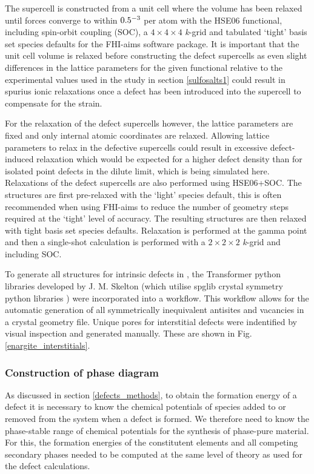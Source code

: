 \documentclass[11pt, twoside]{report}
\begin{document}
The supercell is constructed from a unit cell where the volume has been relaxed until forces converge to within $0.5\time10^{-3}$ per atom with the HSE06 functional, including spin-orbit coupling (SOC), a $4\times4\times4$ \textit{k}-grid and tabulated `tight' basis set species defaults for the FHI-aims software package. It is important that the unit cell volume is relaxed before constructing the defect supercells as even slight differences in the lattice parameters for the given functional relative to the experimental values used in the study in section \ref{sulfosalts1} could result in spurius ionic relaxations once a defect has been introduced into the supercell to compensate for the strain.

For the relaxation of the defect supercells however, the lattice parameters are fixed and only internal atomic coordinates are relaxed. Allowing lattice parameters to relax in the defective supercells could result in excessive defect-induced relaxation which would be expected for a higher defect density than for isolated point defects in the dilute limit, which is being simulated here. Relaxations of the defect supercells are also performed using HSE06+SOC. The structures are first pre-relaxed with the `light' species default, this is often recommended when using FHI-aims to reduce the number of geometry steps required at the `tight' level of accuracy. The resulting structures are then relaxed with tight basis set species defaults. Relaxation is performed at the gamma point and then a single-shot calculation is performed with a $2\times2\times2$ \textit{k}-grid and including SOC.

To generate all structures for intrinsic defects in {\enargite}, the Transformer python libraries \cite{Transformer} developed by J. M. Skelton (which utilise spglib crystal symmetry python libraries \cite{spglib}) were incorporated into a workflow. This workflow allows for the automatic generation of all symmetrically inequivalent antisites and vacancies in a crystal geometry file. Unique pores for interstitial defects were indentified by visual inspection and generated manually. These are shown in Fig. \ref{enargite_interstitials}.



\subsubsection{Construction of phase diagram}
As discussed in section \ref{defects_methods}, to obtain the formation energy of a defect it is necessary to know the chemical potentials of species added to or removed from the system when a defect is formed. We therefore need to know the phase-stable range of chemical potentials for the synthesis of phase-pure material. For this, the formation energies of the constitutent elements and all competing secondary phases needed to be computed at the same level of theory as used for the defect calculations.
\end{document}
